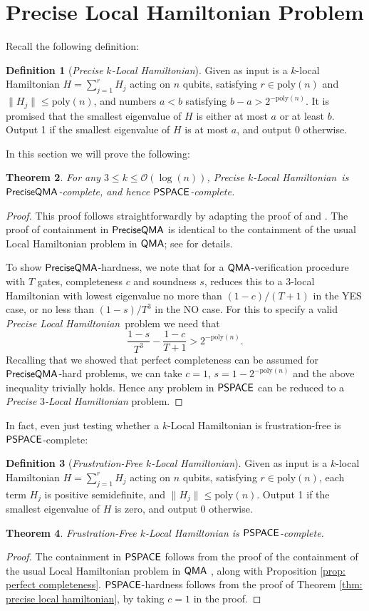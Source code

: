 \documentclass[11pt]{article}
\newtheorem{theorem}{Theorem}
\theoremstyle{definition}
\newtheorem{definition}[theorem]{Definition}
\theoremstyle{remark}
\newcommand\QMA{{\sf{QMA}}}
\newcommand\PSPACE{{\sf{PSPACE}}}
\newcommand\QMAexp{{\sf{PreciseQMA}}}
\newcommand\preciselh{\textit{Precise Local Hamiltonian}}
\newcommand\preciseklh{\textit{Precise }$k$\textit{-Local Hamiltonian}}
\newcommand\preciseilh[1]{\textit{Precise }\ensuremath{#1}\textit{-Local Hamiltonian}}
\newcommand{\poly}{\textrm{poly}}
\begin{document}
\section{Precise Local Hamiltonian Problem}\label{app:localhamiltonian}
Recall the following definition:
\begin{definition}[\preciseklh]
Given as input is a $k$-local Hamiltonian $H=\sum_{j=1}^rH_j$ acting on $n$ qubits, satisfying $r \in \poly(n)$ and $\|H_j\| \le \poly(n)$, and numbers $a < b$ satisfying $b - a > 2^{-\poly(n)}$. It is promised that the smallest eigenvalue of $H$ is either at most $a$ or at least $b$. Output 1 if the smallest eigenvalue of $H$ is at most $a$, and output 0 otherwise.
\end{definition}
In this section we will prove the following:
\begin{theorem}
For any $3 \le k \le \mathcal{O}(\log(n))$, \preciseklh \ is $\QMAexp$-complete, and hence $\PSPACE$-complete.
\end{theorem}
\begin{proof}
This proof follows straightforwardly by adapting the proof of \cite{ksv02} and \cite{kr03}. The proof of containment in $\QMAexp$ is identical to the containment of the usual Local Hamiltonian problem in $\QMA$; see \cite{ksv02} for details.

To show $\QMAexp$-hardness, we note that for a $\QMA$-verification procedure with $T$ gates, completeness $c$ and soundness $s$, \cite{kr03} reduces this to a 3-local Hamiltonian with lowest eigenvalue no more than $(1-c) / (T+1)$ in the YES case, or no less than $(1-s) / T^3$ in the NO case. For this to specify a valid \preciselh \ problem we need that
\begin{equation} \label{eq:preciselh_condition}
\frac{1-s}{T^3} - \frac{1-c}{T+1} > 2^{-\poly(n)}.
\end{equation}
Recalling that we showed that perfect completeness can be assumed for $\QMAexp$-hard problems, we can take $c=1$, $s = 1-2^{-\poly(n)}$ and the above inequality trivially holds. Hence any problem in $\PSPACE$ can be reduced to a \preciseilh{3} problem.
\end{proof}
In fact, even just testing whether a $k$-Local Hamiltonian is frustration-free is $\PSPACE$-complete: \begin{definition} [\emph{Frustration-Free $k$-Local Hamiltonian}] Given as input is a $k$-local Hamiltonian $H=\sum_{j=1}^rH_j$ acting on $n$ qubits, satisfying $r \in \poly(n)$, each term $H_j$ is positive semidefinite, and $\|H_j\| \le \poly(n)$. Output 1 if the smallest eigenvalue of $H$ is zero, and output 0 otherwise.
\end{definition}
\begin{theorem}
Frustration-Free $k$-Local Hamiltonian is $\PSPACE$-complete.
\end{theorem}
\begin{proof}
The containment in $\PSPACE$ follows from the proof of the containment of the usual Local Hamiltonian problem in $\QMA$ \cite{ksv02}, along with Proposition \ref{prop: perfect completeness}. $\PSPACE$-hardness follows from the proof of Theorem \ref{thm: precise local hamiltonian}, by taking $c=1$ in the proof.
\end{proof}
\end{document}
